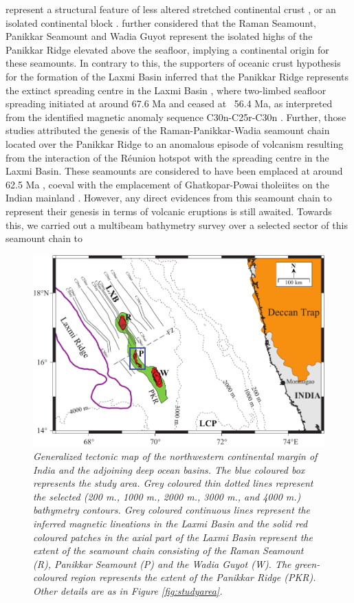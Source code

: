 \documentclass[twocolumn]{article}
\begin{document}
\begin{figure}[!htb]
\end{figure} represent a structural feature of less altered stretched continental crust \citep{Krishna2006}, or an isolated continental block \citep{Geoffroy2020}. \cite{Krishna2006} further considered that the Raman Seamount, Panikkar Seamount and Wadia Guyot represent the isolated highs of the Panikkar Ridge elevated above the seafloor, implying a continental origin for these seamounts. In contrary to this, the supporters of oceanic crust hypothesis for the formation of the Laxmi Basin inferred that the Panikkar Ridge represents the extinct spreading centre in the Laxmi Basin \citep{Bhattacharya1994a,Bhattacharya1994b}, where two-limbed seafloor spreading initiated at around 67.6 Ma and ceased at ~56.4 Ma, as interpreted from the identified magnetic anomaly sequence C30n-C25r-C30n \citep{Bhattacharya2015,Yatheesh2020}. Further, those studies attributed the genesis of the Raman-Panikkar-Wadia seamount chain located over the Panikkar Ridge to an anomalous episode of volcanism resulting from the interaction of the R\'eunion hotspot with the spreading centre in the Laxmi Basin. These seamounts are considered to have been emplaced at around 62.5 Ma \citep{Bhattacharya2015,Yatheesh2020}, coeval with the emplacement of Ghatkopar-Powai tholeiites on the Indian mainland \citep{Pande2017}. However, any direct evidences from this seamount chain to represent their genesis in terms of volcanic eruptions is still awaited. Towards this, we carried out a multibeam bathymetry survey over a selected sector of this seamount chain to
\begin{figure}[!htb]
	\centering
	\includegraphics[width=0.8\linewidth]{tectonic-framework.pdf}
	\caption{
	\textsl{	Generalized tectonic map of the northwestern continental margin of India and the adjoining deep ocean basins. The blue coloured box represents the study area. Grey coloured thin dotted lines represent the selected (200 m., 1000 m., 2000 m., 3000 m., and 4000 m.) bathymetry contours. Grey coloured continuous lines represent the inferred magnetic lineations in the Laxmi Basin  \citep{Bhattacharya2015} and the solid red coloured patches in the axial part of the Laxmi Basin represent the extent of the seamount chain \citep{Bhattacharya1994b} consisting of the Raman Seamount (R), Panikkar Seamount (P) and the Wadia Guyot (W). The green-coloured region represents the extent of the Panikkar Ridge (PKR).  Other details are as in Figure \ref{fig:studyarea}.}
	}
	\label{fig:studyarea2}
\end{figure}
\end{document}

